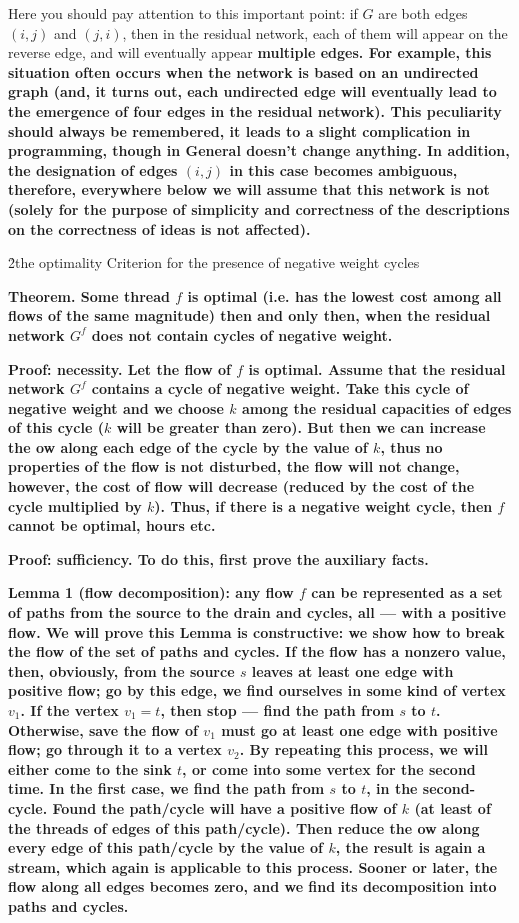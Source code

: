 Here you should pay attention to this important point: if $G$ are both edges $(i,j)$ and $(j,i)$, then in the residual network, each of them will appear on the reverse edge, and will eventually appear \bf{multiple edges}. For example, this situation often occurs when the network is based on an undirected graph (and, it turns out, each undirected edge will eventually lead to the emergence of four edges in the residual network). This peculiarity should always be remembered, it leads to a slight complication in programming, though in General doesn't change anything. In addition, the designation of edges $(i,j)$ in this case becomes ambiguous, therefore, everywhere below we will assume that this network is not (solely for the purpose of simplicity and correctness of the descriptions on the correctness of ideas is not affected).

\h2{the optimality Criterion for the presence of negative weight cycles}

\bf{Theorem.} Some thread $f$ is optimal (i.e. has the lowest cost among all flows of the same magnitude) then and only then, when the residual network $G^f$ does not contain cycles of negative weight.

\bf{Proof: necessity}. Let the flow of $f$ is optimal. Assume that the residual network $G^f$ contains a cycle of negative weight. Take this cycle of negative weight and we choose $k$ among the residual capacities of edges of this cycle ($k$ will be greater than zero). But then we can increase the ow along each edge of the cycle by the value of $k$, thus no properties of the flow is not disturbed, the flow will not change, however, the cost of flow will decrease (reduced by the cost of the cycle multiplied by $k$). Thus, if there is a negative weight cycle, then $f$ cannot be optimal, hours etc.

\bf{Proof: sufficiency}. To do this, first prove the auxiliary facts.

\bf{Lemma 1} (flow decomposition): any flow $f$ can be represented as a set of paths from the source to the drain and cycles, all --- with a positive flow. We will prove this Lemma is constructive: we show how to break the flow of the set of paths and cycles. If the flow has a nonzero value, then, obviously, from the source $s$ leaves at least one edge with positive flow; go by this edge, we find ourselves in some kind of vertex $v_1$. If the vertex $v_1 = t$, then stop --- find the path from $s$ to $t$. Otherwise, save the flow of $v_1$ must go at least one edge with positive flow; go through it to a vertex $v_2$. By repeating this process, we will either come to the sink $t$, or come into some vertex for the second time. In the first case, we find the path from $s$ to $t$, in the second-cycle. Found the path/cycle will have a positive flow of $k$ (at least of the threads of edges of this path/cycle). Then reduce the ow along every edge of this path/cycle by the value of $k$, the result is again a stream, which again is applicable to this process. Sooner or later, the flow along all edges becomes zero, and we find its decomposition into paths and cycles.

